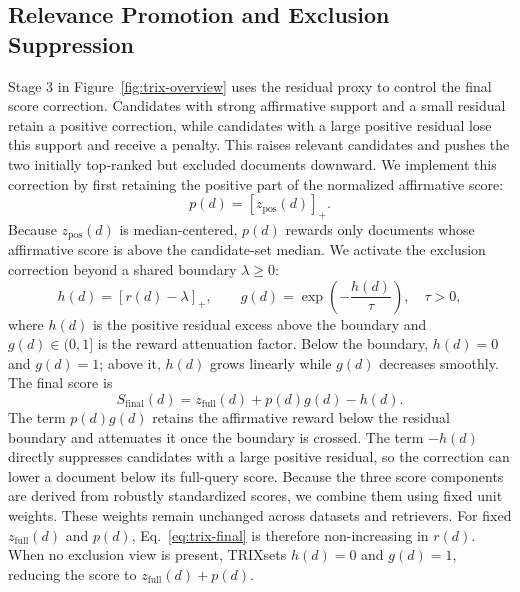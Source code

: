 \documentclass[letterpaper]{article}
\newcommand{\method}{\ifmmode \mathrm{TRIX}\else TRIX\xspace\fi}
\newcommand{\sfinal}{S_{\text{final}}}
\begin{document}
\subsection{Relevance Promotion and Exclusion Suppression}
\label{sec:asymmetric-scoring}

Stage 3 in Figure~\ref{fig:trix-overview} uses the residual proxy to control
the final score correction.  Candidates with strong affirmative support and a
small residual retain a positive correction, while candidates with a large
positive residual lose this support and receive a
penalty.  This raises relevant candidates and pushes the two initially
top-ranked but excluded documents downward.  We implement this correction by
first retaining the positive part of the normalized affirmative score:
\begin{equation}
 p(d)=[z_{\mathrm{pos}}(d)]_+.
 \label{eq:trix-positive}
\end{equation}
Because $z_{\mathrm{pos}}(d)$ is median-centered, $p(d)$ rewards only documents
whose affirmative score is above the candidate-set median.  We activate the
exclusion correction beyond a shared boundary $\lambda\geq0$:
\begin{equation}
 h(d)=[r(d)-\lambda]_+,\qquad
 g(d)=\exp\!\left(-\frac{h(d)}{\tau}\right),\quad \tau>0,
 \label{eq:trix-attenuation}
\end{equation}
where $h(d)$ is the positive residual excess above the boundary and
$g(d)\in(0,1]$ is the reward attenuation factor.  Below the boundary,
$h(d)=0$ and $g(d)=1$; above it, $h(d)$ grows linearly while $g(d)$ decreases
smoothly.
The final score is
\begin{equation}
 \sfinal(d)=z_{\mathrm{full}}(d)+p(d)g(d)-h(d).
 \label{eq:trix-final}
\end{equation}
The term $p(d)g(d)$ retains the affirmative reward below the residual boundary
and attenuates it once the boundary is crossed.  The term $-h(d)$ directly
suppresses candidates with a large positive residual, so the correction can
lower a document below its full-query score.  Because the three score
components are derived from robustly standardized scores, we combine them
using fixed unit weights.  These weights remain unchanged across datasets and
retrievers.  For fixed $z_{\mathrm{full}}(d)$ and $p(d)$,
Eq.~\ref{eq:trix-final} is therefore non-increasing in $r(d)$.
When no exclusion view is present, \method sets $h(d)=0$ and $g(d)=1$, reducing
the score to $z_{\mathrm{full}}(d)+p(d)$.

\end{document}
